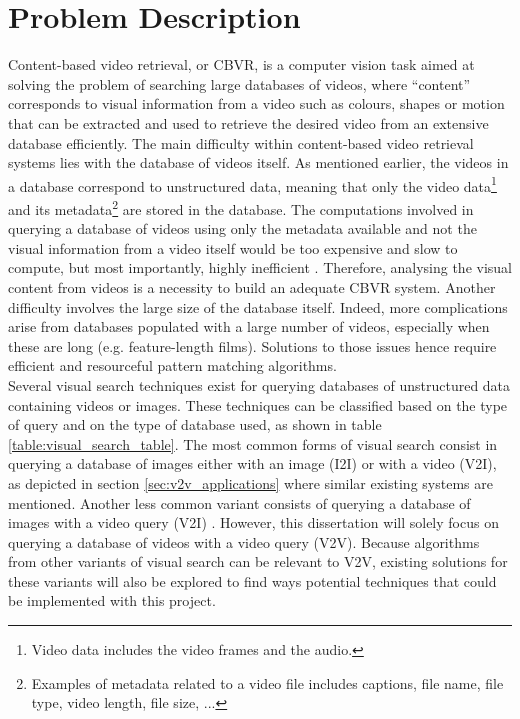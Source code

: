 
\section{Problem Description}
\label{sec:problem-description}

Content-based video retrieval, or CBVR, is a computer vision task aimed at solving the problem of searching large databases of videos, where ``content'' corresponds to visual information from a video such as colours, shapes or motion that can be extracted and used to retrieve the desired video from an extensive database efficiently. The main difficulty within content-based video retrieval systems lies with the database of videos itself. As mentioned earlier, the videos in a database correspond to unstructured data, meaning that only the video data\footnote{Video data includes the video frames and the audio.} and its metadata\footnote{Examples of metadata related to a video file includes captions, file name, file type, video length, file size, ...} are stored in the database. The computations involved in querying a database of videos using only the metadata available and not the visual information from a video itself would be too expensive and slow to compute, but most importantly, highly inefficient \cite{patel2012}. Therefore, analysing the visual content from videos is a necessity to build an adequate CBVR system. Another difficulty involves the large size of the database itself. Indeed, more complications arise from databases populated with a large number of videos, especially when these are long (e.g. feature-length films). Solutions to those issues hence require efficient and resourceful pattern matching algorithms.\\

Several visual search techniques exist for querying databases of unstructured data containing videos or images. These techniques can be classified based on the type of query and on the type of database used, as shown in table \ref{table:visual_search_table}. The most common forms of visual search consist in querying a database of images either with an image (I2I) or with a video (V2I), as depicted in section \ref{sec:v2v_applications} where similar existing systems are mentioned. Another less common variant consists of querying a database of images with a video query (V2I) \cite{araujo2017i2v}. However, this dissertation will solely focus on querying a database of videos with a video query (V2V). Because algorithms from other variants of visual search can be relevant to V2V, existing solutions for these variants will also be explored to find ways potential techniques that could be implemented with this project.\\

